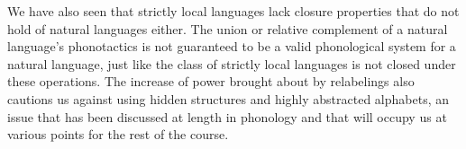 We have also seen that strictly local languages lack closure properties that do not hold of natural languages either.
The union or relative complement of a natural language's phonotactics is not guaranteed to be a valid phonological system for a natural language, just like the class of strictly local languages is not closed under these operations.
The increase of power brought about by relabelings also cautions us against using hidden structures and highly abstracted alphabets, an issue that has been discussed at length in phonology and that will occupy us at various points for the rest of the course.


